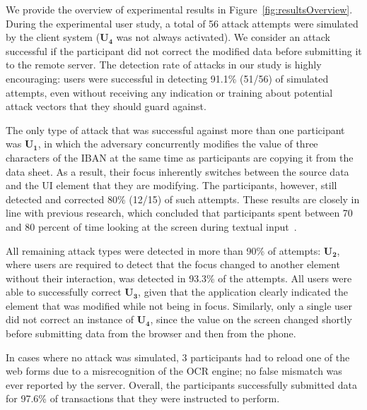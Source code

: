 \documentclass[sigconf, anonymous, balance=false]{acmart}
\newcommand{\myparagraph}[1]{\myparagraphnodot{#1.}}
\newcommand{\myparagraphnodot}[1]{\vspace{4pt} \noindent {\bfseries #1}\xspace}
\newcommand{\atk}[1]{$\mathbf{U_#1}$\xspace}
\newcommand{\updatelater}[1]{#1\xspace}
\begin{document}
\myparagraph{Results}
We provide the overview of experimental results in Figure~\ref{fig:resultsOverview}. During the experimental user study, a total of \updatelater{56} attack attempts were simulated by the client system (\atk{4} was not always activated).
We consider an attack successful if the participant did not correct the modified data before submitting it to the remote server.
The detection rate of attacks in our study is highly encouraging: users were successful in detecting \updatelater{91.1\%} (\updatelater{51/56}) of simulated attempts, even without receiving any indication or training about potential attack vectors that they should guard against.

The only type of attack that was successful against more than one participant was \atk{1}, in which the adversary concurrently modifies the value of three characters of the IBAN at the same time as participants are copying it from the data sheet.
As a result, their focus inherently switches between the source data and the UI element that they are modifying.
The participants, however, still detected and corrected \updatelater{80\%} (\updatelater{12/15}) of such attempts.
These results are closely in line with previous research, which concluded that participants spent between 70 and 80 percent of time looking at the screen during textual input~\cite{howWeType}.

All remaining attack types were detected in more than 90\% of attempts:
\atk{2}, where users are required to detect that the focus changed to another element without their interaction, was detected in \updatelater{93.3\%} of the attempts.
All users were able to successfully correct \atk{3}, given that the application clearly indicated the element that was modified while not being in focus.
Similarly, only a single user did not correct an instance of \atk{4}, since the value on the screen changed shortly before submitting data from the browser and then from the phone.


In cases where no attack was simulated, \updatelater{3} participants had to reload one of the web forms due to a misrecognition of the OCR engine; no false mismatch was ever reported by the server.
Overall, the participants successfully submitted data for \updatelater{97.6\%} of transactions that they were instructed to perform.
\end{document}
